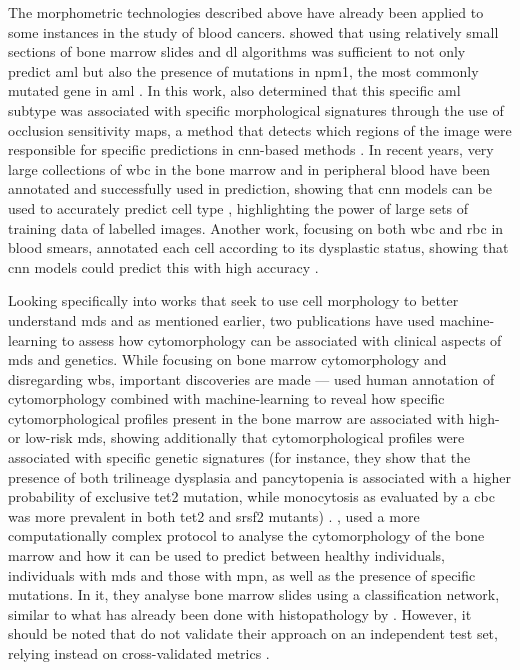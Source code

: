 The morphometric technologies described above have already been applied to some instances in the study of blood cancers.  showed that using relatively small sections of bone marrow slides and \ac{dl} algorithms was sufficient to not only predict \ac{aml} but also the presence of mutations in \ac{npm1}, the most commonly mutated gene in \ac{aml} \cite{Eckardt2021-fb}. In this work,  also determined that this specific \ac{aml} subtype was associated with specific morphological signatures through the use of occlusion sensitivity maps, a method that detects which regions of the image were responsible for specific predictions in \ac{cnn}-based methods \cite{Zeiler2013-jk}. In recent years, very large collections of \ac{wbc} in the bone marrow and in peripheral blood have been annotated and successfully used in prediction, showing that \ac{cnn} models can be used to accurately predict cell type \cite{Matek2019-ld,Matek2021-mp,Kouzehkanan2021-mz}, highlighting the power of large sets of training data of labelled images. Another work, focusing on both \ac{wbc} and \ac{rbc} in blood smears, annotated each cell according to its dysplastic status, showing that \ac{cnn} models could predict this with high accuracy \cite{Mori2020-dn}.

Looking specifically into works that seek to use cell morphology to better understand \ac{mds} and as mentioned earlier, two publications have used machine-learning to assess how cytomorphology can be associated with clinical aspects of \ac{mds} and genetics. While focusing on bone marrow cytomorphology and disregarding \ac{wbs}, important discoveries are made ---  used human annotation of cytomorphology combined with machine-learning to reveal how specific cytomorphological profiles present in the bone marrow are associated with high- or low-risk \ac{mds}, showing additionally that cytomorphological profiles were associated with specific genetic signatures (for instance, they show that the presence of both trilineage dysplasia and pancytopenia is associated with a higher probability of exclusive \ac{tet2} mutation, while monocytosis as evaluated by a \ac{cbc} was more prevalent in both \ac{tet2} and \ac{srsf2} mutants) \cite{Nagata2020-lh}. , used a more computationally complex protocol to analyse the cytomorphology of the bone marrow and how it can be used to predict between healthy individuals, individuals with \ac{mds} and those with \ac{mpn}, as well as the presence of specific mutations. In it, they analyse bone marrow slides using a classification network, similar to what has already been done with histopathology by  \cite{Fu2020-mx}. However, it should be noted that  do not validate their approach on an independent test set, relying instead on cross-validated metrics \cite{Bruck2021-fx}. 

